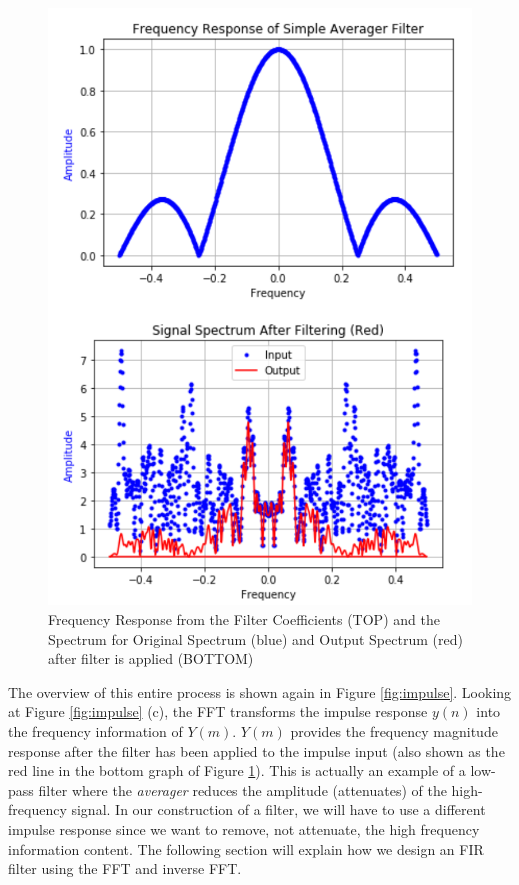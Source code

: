 \begin{figure}[h!]
	\centering
	\includegraphics[scale = .8]{images/example_spectrum.png} %
	\caption{Frequency Response from the Filter Coefficients (TOP) and the Spectrum for Original Spectrum (blue) and Output Spectrum (red) after filter is applied (BOTTOM)}
	\label{fig:exspec}
\end{figure}    

The overview of this entire process is shown again in Figure
\ref{fig:impulse}. Looking at Figure \ref{fig:impulse} (c), the
FFT transforms the impulse response $y(n)$ into the frequency
information of $Y(m)$. $Y(m)$ provides the frequency magnitude
response after the filter has been applied to the impulse input
(also shown as the red line in the bottom graph of Figure
\ref{fig:exspec}). This is actually an example of a low-pass
filter where the \textit{averager} reduces the amplitude
(attenuates) of the high-frequency signal. In our construction of
a filter, we will have to use a different impulse response since
we want to remove, not attenuate, the high frequency information
content. The following section will explain how we design an FIR
filter using the FFT and inverse FFT.

